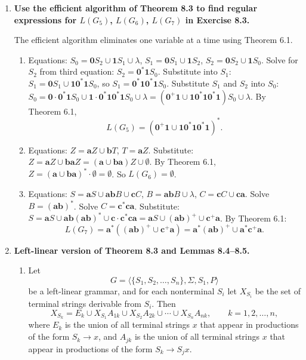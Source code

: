 \begin{enumerate}[{8.}1. ]
\item \textbf{Use the efficient algorithm of Theorem 8.3 to find regular expressions for $L(G_5)$, $L(G_6)$, $L(G_7)$ in Exercise 8.3.}

The efficient algorithm eliminates one variable at a time using
Theorem 6.1.

\begin{enumerate}
\item[$G_5$:] Equations: $S_0 = \pmb{0}S_2 \cup \pmb{1}S_1 \cup \lambda$, $S_1 = \pmb{0}S_1 \cup \pmb{1}S_2$, $S_2 = \pmb{0}S_2 \cup \pmb{1}S_0$.
Solve for $S_2$ from third equation: $S_2 = \pmb{0}^*\pmb{1}S_0$.
Substitute into $S_1$: $S_1 = \pmb{0}S_1 \cup \pmb{1}\pmb{0}^*\pmb{1}S_0$, so $S_1 = \pmb{0}^*\pmb{1}\pmb{0}^*\pmb{1}S_0$.
Substitute $S_1$ and $S_2$ into $S_0$: $S_0 = \pmb{0}\cdot\pmb{0}^*\pmb{1}S_0 \cup \pmb{1}\cdot\pmb{0}^*\pmb{1}\pmb{0}^*\pmb{1}S_0 \cup \lambda = (\pmb{0}^+\pmb{1} \cup \pmb{1}\pmb{0}^*\pmb{1}\pmb{0}^*\pmb{1})S_0 \cup \lambda$.
By Theorem 6.1,
\[
L(G_5) = (\pmb{0}^+\pmb{1}\cup
\pmb{1}\pmb{0}^*\pmb{1}\pmb{0}^*\pmb{1})^*.
\]

\item[$G_6$:] Equations: $Z = \pmb{a}Z \cup \pmb{b}T$, $T = \pmb{a}Z$. Substitute: $Z = \pmb{a}Z \cup \pmb{ba}Z = (\pmb{a}\cup\pmb{ba})Z \cup \emptyset$. By Theorem 6.1, $Z = (\pmb{a}\cup\pmb{ba})^*\cdot\emptyset = \emptyset$. So $L(G_6) = \emptyset$.

\item[$G_7$:] Equations: $S = \pmb{a}S \cup \pmb{ab}B \cup \pmb{c}C$, $B = \pmb{ab}B \cup \lambda$, $C = \pmb{c}C \cup \pmb{ca}$.
Solve $B = (\pmb{ab})^*$.
Solve $C = \pmb{c}^*\pmb{ca}$.
Substitute: $S = \pmb{a}S \cup \pmb{ab}(\pmb{ab})^* \cup \pmb{c}\cdot\pmb{c}^*\pmb{ca} = \pmb{a}S \cup (\pmb{ab})^+\cup\pmb{c}^+\pmb{a}$.
By Theorem 6.1:
\[
L(G_7) = \pmb{a}^*((\pmb{ab})^+\cup\pmb{c}^+\pmb{a})
       = \pmb{a}^*(\pmb{ab})^+\cup\pmb{a}^*\pmb{c}^+\pmb{a}.
\]
\end{enumerate}

\item \textbf{Left-linear version of Theorem 8.3 and Lemmas 8.4--8.5.}

\begin{enumerate}
\item Let
\[
G=\langle\{S_1,S_2,\ldots,S_n\},\Sigma,S_1,P\rangle
\]
be a left-linear grammar, and for each nonterminal $S_i$ let $X_{S_i}$ be the
set of terminal strings derivable from $S_i$.  Then
\[
X_{S_k}=E_k\cup X_{S_1}A_{1k}\cup X_{S_2}A_{2k}\cup\cdots\cup X_{S_n}A_{nk},
\qquad k=1,2,\ldots,n,
\]
where $E_k$ is the union of all terminal strings $x$ that appear in
productions of the form $S_k\to x$, and $A_{jk}$ is the union of all terminal
strings $x$ that appear in productions of the form $S_k\to S_jx$.


\end{enumerate}
\end{enumerate}
